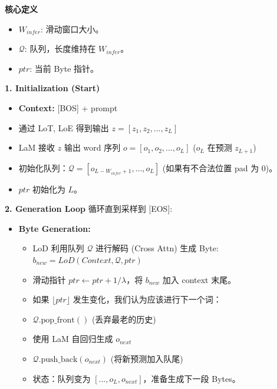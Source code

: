 \documentclass[a4paper,11pt]{article}
\begin{document}
\textbf{核心定义}
\begin{itemize}
    \item $W_{infer}$: 滑动窗口大小。
    \item $\mathcal{Q}$: 队列，长度维持在 $W_{infer}$。
    \item $ptr$: 当前 Byte 指针。
\end{itemize}

\textbf{1. Initialization (Start)}
\begin{itemize}
    \item \textbf{Context:} [BOS] + prompt
    \item 通过 LoT, LoE 得到输出 $z=[z_{1}, z_{2}, \dots, z_{L}]$
    \item LaM 接收 $z$ 输出 word 序列 $o=[o_{1}, o_{2}, \dots, o_{L}]$ ($o_{L}$ 在预测 $z_{L+1}$)
    \item 初始化队列：$\mathcal{Q}=[o_{L-W_{infer}+1}, \dots, o_{L}]$ (如果有不合法位置 pad 为 0)。
    \item $ptr$ 初始化为 $L$。
\end{itemize}

\textbf{2. Generation Loop}
循环直到采样到 [EOS]:
\begin{itemize}
    \item \textbf{Byte Generation:}
    \begin{itemize}
        \item LoD 利用队列 $\mathcal{Q}$ 进行解码 (Cross Attn) 生成 Byte: $b_{new} = LoD(Context, \mathcal{Q}, ptr)$
        \item 滑动指针 $ptr \leftarrow ptr + 1/\lambda$，将 $b_{new}$ 加入 context 末尾。
        \item 如果 $\lfloor ptr \rfloor$ 发生变化，我们认为应该进行下一个词：
        \item $\mathcal{Q}.\text{pop\_front}()$ (丢弃最老的历史)
        \item 使用 LaM 自回归生成 $o_{next}$
        \item $\mathcal{Q}.\text{push\_back}(o_{next})$ (将新预测加入队尾)
        \item 状态：队列变为 $[\dots, o_{L}, o_{next}]$，准备生成下一段 Bytes。
    \end{itemize}
\end{itemize}
\end{document}
